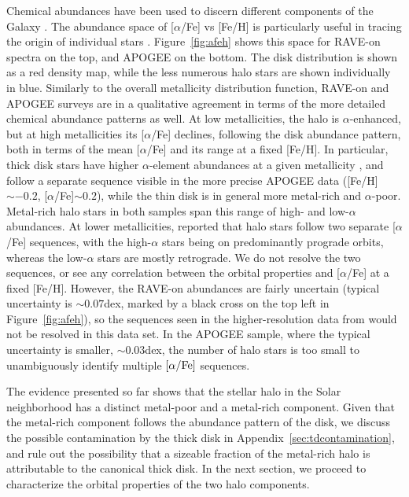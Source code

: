 \documentclass[apj, twocolappendix, numberedappendix, appendixfloats]{emulateapj}
\begin{document}
Chemical abundances have been used to discern different components of the Galaxy \citep[e.g.,][]{gilmore1989}.
The abundance space of [$\alpha$/Fe] vs [Fe/H] is particularly useful in tracing the origin of individual stars \citep[e.g.,][]{lee2015}.
Figure~\ref{fig:afeh} shows this space for RAVE-on spectra on the top, and APOGEE on the bottom.
The disk distribution is shown as a red density map, while the less numerous halo stars are shown individually in blue.
Similarly to the overall metallicity distribution function, RAVE-on and APOGEE surveys are in a qualitative agreement in terms of the more detailed chemical abundance patterns as well.
At low metallicities, the halo is $\alpha$-enhanced, but at high metallicities its [$\alpha$/Fe] declines, following the disk abundance pattern, both in terms of the mean [$\alpha$/Fe] and its range at a fixed [Fe/H].
In particular, thick disk stars have higher $\alpha$-element abundances at a given metallicity \citep[e.g.,][]{nidever2014}, and follow a separate sequence visible in the more precise APOGEE data ([Fe/H]$\sim-0.2$, [$\alpha$/Fe]$\sim0.2$), while the thin disk is in general more metal-rich and $\alpha$-poor.
Metal-rich halo stars in both samples span this range of high- and low-$\alpha$ abundances.
At lower metallicities, \citet{ns2010} reported that halo stars follow two separate [$\alpha$/Fe] sequences, with the high-$\alpha$ stars being on predominantly prograde orbits, whereas the low-$\alpha$ stars are mostly retrograde.
We do not resolve the two sequences, or see any correlation between the orbital properties and [$\alpha$/Fe] at a fixed [Fe/H].
However, the RAVE-on abundances are fairly uncertain (typical uncertainty is $\sim0.07$\;dex, marked by a black cross on the top left in Figure~\ref{fig:afeh}), so the sequences seen in the higher-resolution data from \citet{ns2010} would not be resolved in this data set.
In the APOGEE sample, where the typical uncertainty is smaller, $\sim0.03$\;dex, the number of halo stars is too small to unambiguously identify multiple $[\alpha/\rm Fe]$ sequences.

The evidence presented so far shows that the stellar halo in the Solar neighborhood has a distinct metal-poor and a metal-rich component.
Given that the metal-rich component follows the abundance pattern of the disk, we discuss the possible contamination by the thick disk in Appendix~\ref{sec:tdcontamination}, and rule out the possibility that a sizeable fraction of the metal-rich halo is attributable to the canonical thick disk.
In the next section, we proceed to characterize the orbital properties of the two halo components.
\end{document}
